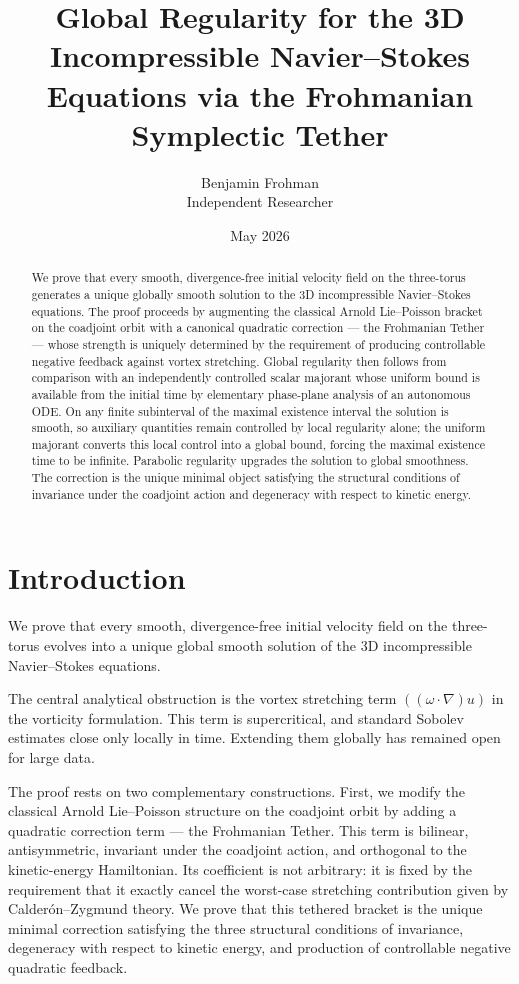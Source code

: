 \documentclass[11pt,a4paper]{article}
\title{\textbf{Global Regularity for the 3D Incompressible Navier--Stokes Equations via the Frohmanian Symplectic Tether}}
\author{Benjamin Frohman \\ Independent Researcher}
\date{May 2026}
\begin{document}
\maketitle

\begin{abstract}
We prove that every smooth, divergence-free initial velocity field on the three-torus generates a unique globally smooth solution to the 3D incompressible Navier--Stokes equations. The proof proceeds by augmenting the classical Arnold Lie--Poisson bracket on the coadjoint orbit with a canonical quadratic correction — the Frohmanian Tether — whose strength is uniquely determined by the requirement of producing controllable negative feedback against vortex stretching. Global regularity then follows from comparison with an independently controlled scalar majorant whose uniform bound is available from the initial time by elementary phase-plane analysis of an autonomous ODE. On any finite subinterval of the maximal existence interval the solution is smooth, so auxiliary quantities remain controlled by local regularity alone; the uniform majorant converts this local control into a global bound, forcing the maximal existence time to be infinite. Parabolic regularity upgrades the solution to global smoothness. The correction is the unique minimal object satisfying the structural conditions of invariance under the coadjoint action and degeneracy with respect to kinetic energy.
\end{abstract}

\section{Introduction}

We prove that every smooth, divergence-free initial velocity field on the three-torus evolves into a unique global smooth solution of the 3D incompressible Navier--Stokes equations.

The central analytical obstruction is the vortex stretching term $((\omega \cdot \nabla)u)$ in the vorticity formulation. This term is supercritical, and standard Sobolev estimates close only locally in time. Extending them globally has remained open for large data.

The proof rests on two complementary constructions. First, we modify the classical Arnold Lie--Poisson structure on the coadjoint orbit by adding a quadratic correction term — the Frohmanian Tether. This term is bilinear, antisymmetric, invariant under the coadjoint action, and orthogonal to the kinetic-energy Hamiltonian. Its coefficient is not arbitrary: it is fixed by the requirement that it exactly cancel the worst-case stretching contribution given by Calderón–Zygmund theory. We prove that this tethered bracket is the unique minimal correction satisfying the three structural conditions of invariance, degeneracy with respect to kinetic energy, and production of controllable negative quadratic feedback.
\end{document}
